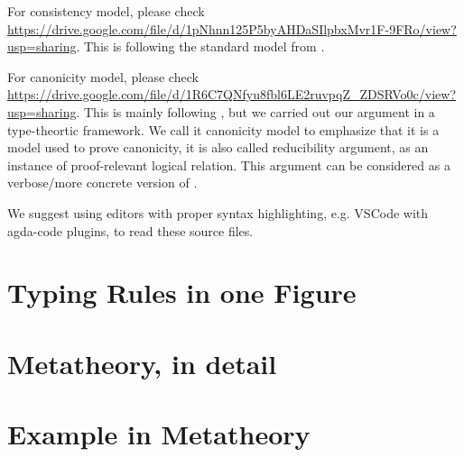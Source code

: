 For consistency model, please check \\ \href{https://drive.google.com/file/d/1pNhnn125P5byAHDaSIlpbxMvr1F-9FRo/view?usp=sharing}{https://drive.google.com/file/d/1pNhnn125P5byAHDaSIlpbxMvr1F-9FRo/view?usp=sharing}. This is following the standard model from \citet{altkap2016,kaposi2017type,kaposi2019gluing}.

For canonicity model, please check \\ \href{https://drive.google.com/file/d/1R6C7QNfyu8fbl6LE2ruvpqZ_ZDSRVo0c/view?usp=sharing}{https://drive.google.com/file/d/1R6C7QNfyu8fbl6LE2ruvpqZ_ZDSRVo0c/view?usp=sharing}. This is mainly following \citet{coquand2018canonicity,sterling2019algebraic}, but we carried out our argument in a type-theortic framework.  We call it canonicity model to emphasize that it is a model used to prove canonicity, it is also called reducibility argument, as an instance of proof-relevant logical relation. This argument can be considered as a verbose/more concrete version of \citet{kaposi2019gluing}.

We suggest using editors with proper syntax highlighting, e.g. VSCode with agda-code plugins, to read these source files.

\section{Typing Rules in one Figure}


\section{Metatheory, in detail}

\label{sec:metatheory}



\section{Example in Metatheory}\label{sec:coqexample}
